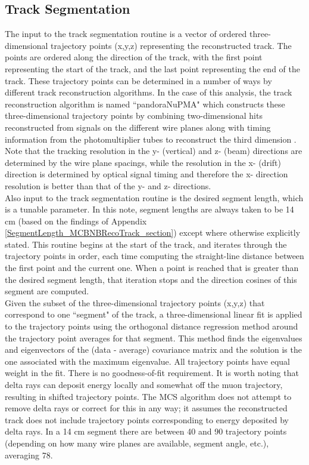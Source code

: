 \subsection{Track Segmentation}\label{track_segmentation_section}
The input to the track segmentation routine is a vector of ordered three-dimensional trajectory points (x,y,z) representing the reconstructed track. The points are ordered along the direction of the track, with the first point representing the start of the track, and the last point representing the end of the track. These trajectory points can be determined in a number of ways by different track reconstruction algorithms. In the case of this analysis, the track reconstruction algorithm is named ``pandoraNuPMA" which constructs these three-dimensional trajectory points by combining two-dimensional hits reconstructed from signals on the different wire planes along with timing information from the photomultiplier tubes to reconstruct the third dimension \cite{Marshall:2015rfa}. Note that the tracking resolution in the y- (vertical) and z- (beam) directions are determined by the wire plane spacings, while the resolution in the x- (drift) direction is determined by optical signal timing and therefore the x- direction resolution is better than that of the y- and z- directions.\\

Also input to the track segmentation routine is the desired segment length, which is a tunable parameter. In this note, segment lengths are always taken to be 14 cm (based on the findings of Appendix \ref{SegmentLength_MCBNBRecoTrack_section}) except where otherwise explicitly stated. This routine begins at the start of the track, and iterates through the trajectory points in order, each time computing the straight-line distance between the first point and the current one. When a point is reached that is greater than the desired segment length, that iteration stops and the direction cosines of this segment are computed.\\

Given the subset of the three-dimensional trajectory points (x,y,z) that correspond to one ``segment" of the track, a three-dimensional linear fit is applied to the trajectory points using the orthogonal distance regression method around the trajectory point averages for that segment. This method finds the eigenvalues and eigenvectors of the (data - average) covariance matrix and the solution is the one associated with the maximum eigenvalue. All trajectory points have equal weight in the fit. There is no goodness-of-fit requirement. It is worth noting that delta rays can deposit energy locally and somewhat off the muon trajectory, resulting in shifted trajectory points. The MCS algorithm does not attempt to remove delta rays or correct for this in any way; it assumes the reconstructed track does not include trajectory points corresponding to energy deposited by delta rays. In a 14 cm segment there are between 40 and 90 trajectory points (depending on how many wire planes are available, segment angle, etc.), averaging 78. \\

